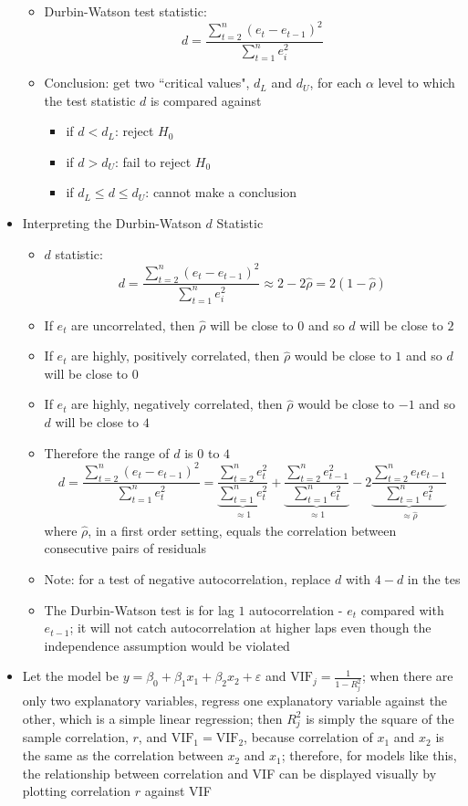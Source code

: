 \documentclass[12pt]{article}
\begin{document}
\begin{itemize}
\begin{itemize}
\item Durbin-Watson test statistic: $$ d = \frac{ \sum_{t=2}^n (e_t - e_{t-1})^2}{ \sum_{t=1}^n e_i^2} $$ 
\item Conclusion: get two ``critical values", $d_L$ and $d_U$, for each $\alpha$ level to which the test statistic $d$ is compared against \begin{itemize} 
\item if $d < d_L$: reject $H_0$
\item if $d > d_U$: fail to reject $H_0$
\item if $d_L \leq d \leq d_U$: cannot make a conclusion \end{itemize} \end{itemize}
\item Interpreting the Durbin-Watson $d$ Statistic \begin{itemize} 
\item $d$ statistic: $$ d = \frac{\sum_{t=2}^n (e_t - e_{t-1})^2}{\sum_{t=1}^n e_i^2} \approx 2 - 2\hat{\rho} = 2(1 - \hat{\rho}) $$ 
\item If $e_t$ are uncorrelated, then $\hat{\rho}$ will be close to $0$ and so $d$ will be close to $2$ 
\item If $e_t$ are highly, positively correlated, then $\hat{\rho}$ would be close to $1$ and so $d$ will be close to $0$
\item If $e_t$ are highly, negatively correlated, then $\hat{\rho}$ would be close to $-1$ and so $d$ will be close to $4$ 
\item Therefore the range of $d$ is $0$ to $4$ 
$$ d = \frac{\sum_{t=2}^n (e_t - e_{t-1})^2}{\sum_{t=1}^n e_t^2} = \underbrace{\frac{\sum_{t=2}^n e_t^2}{\sum_{t=1}^n e_t^2}}_{\approx 1} + \underbrace{\frac{\sum_{t=2}^n e_{t-1}^2}{\sum_{t=1}^n e_t^2}}_{\approx 1} - 2\underbrace{\frac{\sum_{t=2}^n e_te_{t-1}}{\sum_{t=1}^n e_t^2}}_{\approx \hat{\rho}} $$ where $\hat{\rho}$, in a first order setting, equals the correlation between consecutive pairs of residuals
\item Note: for a test of negative autocorrelation, replace $d$ with $4-d$ in the tes
\item The Durbin-Watson test is for lag $1$ autocorrelation - $e_t$ compared with $e_{t-1}$; it will not catch autocorrelation at higher laps even though the independence assumption would be violated 
 \end{itemize} 
\item Let the model be $y = \beta_0 + \beta_1x_1 + \beta_2x_2 + \varepsilon$ and $\text{VIF}_j = \frac{1}{1 - R^2_j}$; when there are only two explanatory variables, regress one explanatory variable against the other, which is a simple linear regression; then $R_j^2$ is simply the square of the sample correlation, $r$, and $\text{VIF}_1 = \text{VIF}_2$, because correlation of $x_1$ and $x_2$ is the same as the correlation between $x_2$ and $x_1$; therefore, for models like this, the relationship between correlation and VIF can be displayed visually by plotting correlation $r$ against VIF
\end{itemize}
\end{document}
